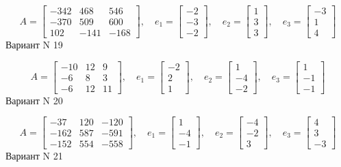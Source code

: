 \documentclass[11pt]{report}
\begin{document}
$$A = \left[\begin{matrix}-342 & 468 & 546\\-370 & 509 & 600\\102 & -141 & -168\end{matrix}\right],\quad e_1 = \left[\begin{matrix}-2\\-3\\-2\end{matrix}\right],\quad e_2 = \left[\begin{matrix}1\\3\\3\end{matrix}\right],\quad e_3 = \left[\begin{matrix}-3\\1\\4\end{matrix}\right]$$Вариант N 19

$$A = \left[\begin{matrix}-10 & 12 & 9\\-6 & 8 & 3\\-6 & 12 & 11\end{matrix}\right],\quad e_1 = \left[\begin{matrix}-2\\2\\1\end{matrix}\right],\quad e_2 = \left[\begin{matrix}1\\-4\\-2\end{matrix}\right],\quad e_3 = \left[\begin{matrix}1\\-1\\-1\end{matrix}\right]$$Вариант N 20

$$A = \left[\begin{matrix}-37 & 120 & -120\\-162 & 587 & -591\\-152 & 554 & -558\end{matrix}\right],\quad e_1 = \left[\begin{matrix}1\\-4\\-1\end{matrix}\right],\quad e_2 = \left[\begin{matrix}-4\\-2\\3\end{matrix}\right],\quad e_3 = \left[\begin{matrix}4\\3\\-3\end{matrix}\right]$$Вариант N 21
\end{document}
